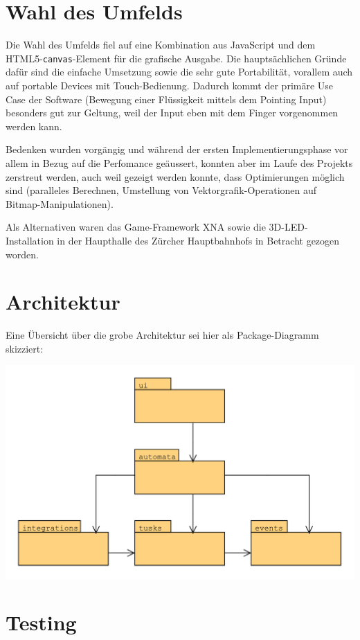 \documentclass[11pt]{article} %
\theoremstyle{definition}
\begin{document}
\section{Wahl des Umfelds}

Die Wahl des Umfelds fiel auf eine Kombination aus JavaScript und dem HTML5-{\tt canvas}-Element für die grafische Ausgabe. Die hauptsächlichen Gründe dafür sind die einfache Umsetzung sowie die sehr gute Portabilität, vorallem auch auf portable Devices mit Touch-Bedienung. Dadurch kommt der primäre Use Case der Software (Bewegung einer Flüssigkeit mittels dem Pointing Input) besonders gut zur Geltung, weil der Input eben mit dem Finger vorgenommen werden kann.

Bedenken wurden vorgängig und während der ersten Implementierungsphase vor allem in Bezug auf die Perfomance geäussert, konnten aber im Laufe des Projekts zerstreut werden, auch weil gezeigt werden konnte, dass Optimierungen möglich sind (paralleles Berechnen, Umstellung von Vektorgrafik-Operationen auf Bitmap-Manipulationen).

Als Alternativen waren das Game-Framework XNA sowie die 3D-LED-Installation in der Haupthalle des Zürcher Hauptbahnhofs in Betracht gezogen worden.

\section{Architektur}

Eine Übersicht über die grobe Architektur sei hier als Package-Diagramm skizziert:

\includegraphics[scale=0.7]{uml/Architektur.pdf}

\section{Testing}
\end{document}
